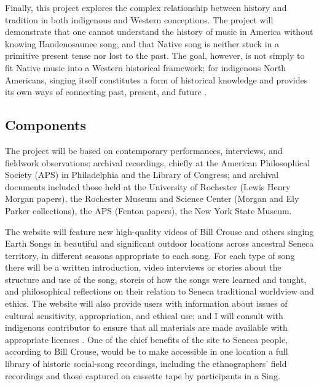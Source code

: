 \documentclass{neh}
\begin{document}
Finally, this project explores the complex relationship between history and
tradition in both indigenous and Western conceptions.
The project will demonstrate that one cannot understand the history of music
in America without knowing Haudenosaunee song, and that Native song is neither 
stuck in a primitive present tense nor lost to the past.
The goal, however, is not simply to fit Native music into a Western historical
framework; 
for indigenous North Americans, singing itself constitutes a form of
historical knowledge and provides its own ways of connecting past, present,
and future
\Autocite{Diamond:NativeAmericanHistory}.
\subsection{Components}

The project will be based on contemporary performances, interviews, and
fieldwork observations; archival recordings, chiefly at the American
Philosophical Society (APS) in Philadelphia and the Library of Congress; and
archival documents included those held at the University of Rochester (Lewis
Henry Morgan papers), the Rochester Museum and Science Center (Morgan and Ely
Parker collections), the APS (Fenton papers), the New York State Museum.

The website will feature new high-quality videos of Bill Crouse and others
singing Earth Songs in beautiful and significant outdoor locations
across ancestral Seneca territory, in different seasons appropriate to each
song.
For each type of song there will be a written introduction, video interviews
or stories about the structure and use of the song, storeis of how the songs
were learned and taught, and philosophical reflections on their relation to
Seneca traditional worldview and ethics.
The website will also provide users with information about issues of cultural
sensitivity, appropriation, and ethical use; and I will consult with
indigenous contributor to ensure that all materials are made available with
appropriate licenses
\Autocite{Christen:RelationshipsNotRecords}.
One of the chief benefits of the site to Seneca people, according to Bill
Crouse, would be to make accessible in one location a full library of
historic social-song recordings, including the ethnographers' field recordings
and those captured on cassette tape by participants in a Sing.
\end{document}
